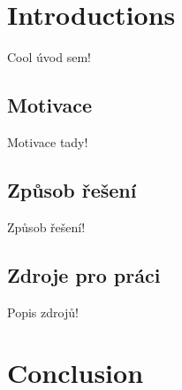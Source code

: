 \documentclass[a4paper, twoside, 12pt]{report}
\begin{document}
\newpage
\thispagestyle{fancy}

\setcounter{page}{11}

\tableofcontents
\pagestyle{plain}


\newpage
{}
\listoffigures
\thispagestyle{fancy}


\newpage
{}
\listoftables
\thispagestyle{fancy}


\newpage

\fancyhead[RO,LE]{\chaptername ~\thechapter ~- \leftmark}
\pagestyle{fancy}
\renewcommand{\chaptermark}[1]{ \markboth{#1}{} }
\renewcommand{\sectionmark}[1]{ \markright{#1}{} }
\chapter{Introductions}
\thispagestyle{fancy}

Cool úvod sem!

\section{Motivace}

Motivace tady!

\section{Způsob řešení}

Způsob řešení!


\section{Zdroje pro práci}
\label{kap1.zdroje}

Popis zdrojů!


\chapter{Conclusion}
\thispagestyle{fancy}
\end{document}
